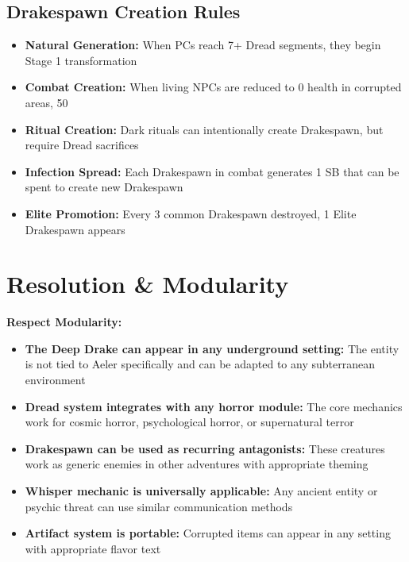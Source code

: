 \documentclass[11pt]{article}
\begin{document}
\subsection{Drakespawn Creation Rules}
\begin{itemize}
\item \textbf{Natural Generation:} When PCs reach 7+ Dread segments, they begin Stage 1 transformation
\item \textbf{Combat Creation:} When living NPCs are reduced to 0 health in corrupted areas, 50%
\item \textbf{Ritual Creation:} Dark rituals can intentionally create Drakespawn, but require Dread sacrifices
\item \textbf{Infection Spread:} Each Drakespawn in combat generates 1 SB that can be spent to create new Drakespawn
\item \textbf{Elite Promotion:} Every 3 common Drakespawn destroyed, 1 Elite Drakespawn appears
\end{itemize}

\section{Resolution \& Modularity}

\textbf{Respect Modularity:}
\begin{itemize}
\item \textbf{The Deep Drake can appear in any underground setting:} The entity is not tied to Aeler specifically and can be adapted to any subterranean environment
\item \textbf{Dread system integrates with any horror module:} The core mechanics work for cosmic horror, psychological horror, or supernatural terror
\item \textbf{Drakespawn can be used as recurring antagonists:} These creatures work as generic enemies in other adventures with appropriate theming
\item \textbf{Whisper mechanic is universally applicable:} Any ancient entity or psychic threat can use similar communication methods
\item \textbf{Artifact system is portable:} Corrupted items can appear in any setting with appropriate flavor text
\end{itemize}
\end{document}

